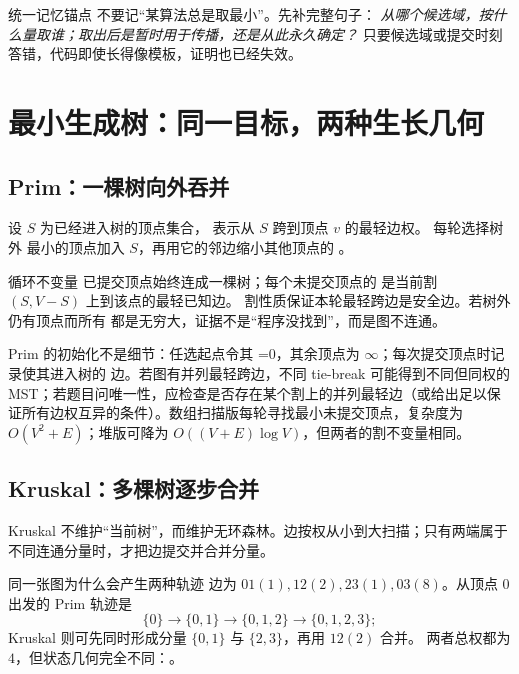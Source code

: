 \documentclass[UTF8,fontset=none,11pt,a4paper]{ctexart}
\begin{document}
\begin{corebox}{统一记忆锚点}
不要记“某算法总是取最小”。先补完整句子：
\emph{从哪个候选域，按什么量取谁；取出后是暂时用于传播，还是从此永久确定？}
只要候选域或提交时刻答错，代码即使长得像模板，证明也已经失效。
\end{corebox}

\section{最小生成树：同一目标，两种生长几何}

\subsection{Prim：一棵树向外吞并}
设 $S$ 为已经进入树的顶点集合， 表示从 $S$ 跨到顶点 $v$ 的最轻边权。
每轮选择树外  最小的顶点加入 $S$，再用它的邻边缩小其他顶点的 。

\begin{methodbox}{循环不变量}
已提交顶点始终连成一棵树；每个未提交顶点的  是当前割 $(S,V-S)$ 上到该点的最轻已知边。
割性质保证本轮最轻跨边是安全边。若树外仍有顶点而所有  都是无穷大，证据不是“程序没找到”，而是图不连通。

Prim 的初始化不是细节：任选起点令其 =0，其余顶点为 $\infty$；每次提交顶点时记录使其进入树的  边。若图有并列最轻跨边，不同 tie-break 可能得到不同但同权的 MST；若题目问唯一性，应检查是否存在某个割上的并列最轻边（或给出足以保证所有边权互异的条件）。数组扫描版每轮寻找最小未提交顶点，复杂度为 $O(V^2+E)$；堆版可降为 $O((V+E)\log V)$，但两者的割不变量相同。
\end{methodbox}



\subsection{Kruskal：多棵树逐步合并}
Kruskal 不维护“当前树”，而维护无环森林。边按权从小到大扫描；只有两端属于不同连通分量时，才把边提交并合并分量。

\begin{examplebox}{同一张图为什么会产生两种轨迹}
边为 $01(1),12(2),23(1),03(8)$。从顶点 $0$ 出发的 Prim 轨迹是
\[
\{0\}\to\{0,1\}\to\{0,1,2\}\to\{0,1,2,3\};
\]
Kruskal 则可先同时形成分量 $\{0,1\}$ 与 $\{2,3\}$，再用 $12(2)$ 合并。
两者总权都为 $4$，但状态几何完全不同：。
\end{examplebox}
\end{document}
